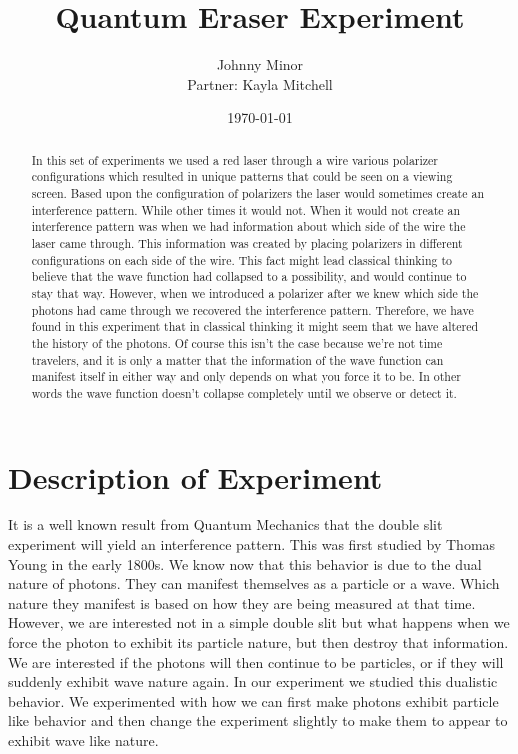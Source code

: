 \documentclass[12pt letterpaper]{article}
\title{Quantum Eraser Experiment}
\author{Johnny Minor \\ Partner: Kayla Mitchell}
\date{\today}
\begin{document}
\maketitle

\begin{abstract}
In this set of experiments we used a red laser through a wire various polarizer configurations which resulted in unique patterns that could be seen on a viewing screen. Based upon the configuration of polarizers the laser would sometimes create an interference pattern. While other times it would not. When it would not create an interference pattern was when we had information about which side of the wire the laser came through. This information was created by placing polarizers in different configurations on each side of the wire. This fact might lead classical thinking to believe that the wave function had collapsed to a possibility, and would continue to stay that way. However, when we introduced a polarizer after we knew which side the photons had came through we recovered the interference pattern. Therefore, we have found in this experiment that in classical thinking it might seem that we have altered the history of the photons. Of course this isn't the case because we're not time travelers, and it is only a matter that the information of the wave function can manifest itself in either way and only depends on what you force it to be. In other words the wave function doesn't collapse completely until we observe or detect it.   
\end{abstract}

\newpage

\section*{Description of Experiment}

It is a well known result from Quantum Mechanics that the double slit experiment will yield an interference pattern. This was first studied by Thomas Young in the early 1800s. We know now that this behavior is due to the dual nature of photons. They can manifest themselves as a particle or a wave. Which nature they manifest is based on how they are being measured at that time. However, we are interested not in a simple double slit but what happens when we force the photon to exhibit its particle nature, but then destroy that information. We are interested if the photons will then continue to be particles, or if they will suddenly exhibit wave nature again. In our experiment we studied this dualistic behavior. We experimented with how we can first make photons exhibit particle like behavior and then change the experiment slightly to make them to appear to exhibit wave like nature. 
\end{document}
